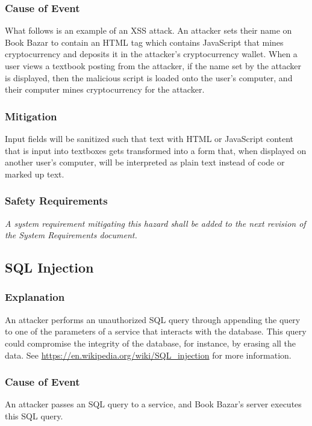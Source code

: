 \documentclass[fullpage]{article}
\begin{document}
\subsubsection*{Cause of Event}
What follows is an example of an XSS attack. An attacker sets their name on Book Bazar to contain an HTML tag which contains JavaScript that mines cryptocurrency and deposits it in the attacker’s cryptocurrency wallet. When a user views a textbook posting from the attacker, if the name set by the attacker is displayed, then the malicious script is loaded onto the user’s computer, and their computer mines cryptocurrency for the attacker.

\subsubsection*{Mitigation}
Input fields will be sanitized such that text with HTML or JavaScript content that is input into textboxes gets transformed into a form that, when displayed on another user's computer, will be interpreted as plain text instead of code or marked up text.

\subsubsection*{Safety Requirements}
\emph{A system requirement mitigating this hazard shall be added to the next revision of the System Requirements document.}

\subsection{SQL Injection}

\subsubsection*{Explanation}
An attacker performs an unauthorized SQL query through appending the query to one of the parameters of a service that interacts with the database. This query could compromise the integrity of the database, for instance, by erasing all the data. See \url{https://en.wikipedia.org/wiki/SQL_injection} for more information.

\subsubsection*{Cause of Event}
An attacker passes an SQL query to a service, and Book Bazar’s server executes this SQL query.
\end{document}
